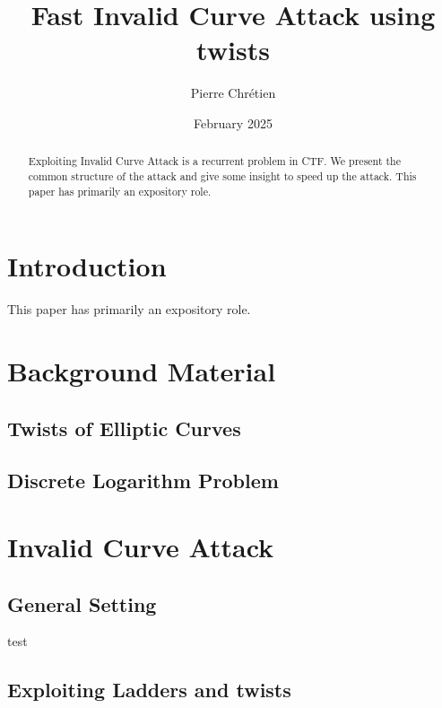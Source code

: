 \documentclass[10pt]{article}
\theoremstyle{definition}
\begin{document}

\author{Pierre Chrétien}
\title{Fast Invalid Curve Attack using twists}
\date{February 2025}
\maketitle
\begin{abstract}
Exploiting Invalid Curve Attack is a recurrent problem in CTF. 
We present the common structure of the attack and give some insight to speed up the attack. 
This paper has primarily an expository role.
\end{abstract}


\section{Introduction}

This paper has primarily an expository role.

\section{Background Material}

\subsection{Twists of Elliptic Curves}

\subsection{Discrete Logarithm Problem}

\section{Invalid Curve Attack}

\subsection{General Setting}
test \cite{reference}
\subsection{Exploiting Ladders and twists}




\end{document}
